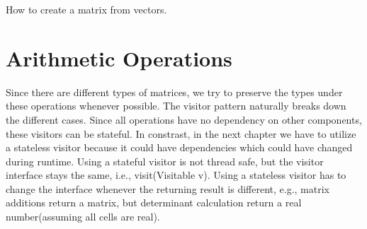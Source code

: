 How to create a matrix from vectors.


\section{Arithmetic Operations}
Since there are different types of matrices, we try to preserve the types under these operations whenever possible. The visitor pattern naturally breaks down the different cases. Since all operations have no dependency on other components, these visitors can be stateful. In constrast, in the next chapter we have to utilize a stateless visitor because it could have dependencies which could have changed during runtime. Using a stateful visitor is not thread safe, but the visitor interface stays the same, i.e., visit(Visitable v). Using a stateless visitor has to change the interface whenever the returning result is different, e.g., matrix additions return a matrix, but determinant calculation return a real number(assuming all cells are real).

